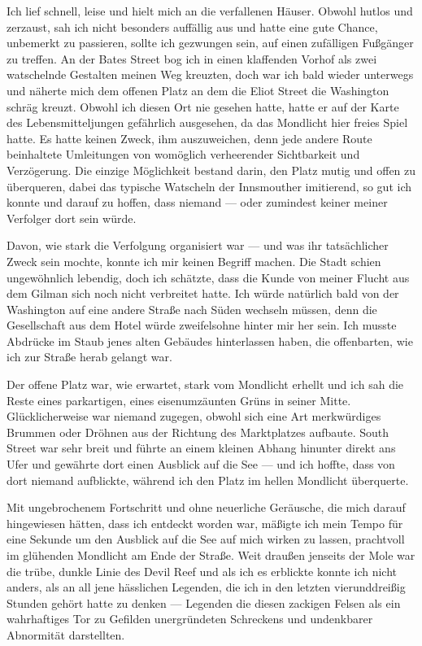 Ich lief schnell, leise und hielt mich an die verfallenen Häuser. Obwohl hutlos und zerzaust, sah ich nicht besonders auffällig aus und hatte eine gute Chance, unbemerkt zu passieren, sollte ich gezwungen sein, auf einen zufälligen Fußgänger zu treffen. An der Bates Street bog ich in einen klaffenden Vorhof als zwei watschelnde Gestalten meinen Weg kreuzten, doch war ich bald wieder unterwegs und näherte mich dem offenen Platz an dem die Eliot Street die Washington schräg kreuzt. Obwohl ich diesen Ort nie gesehen hatte, hatte er auf der Karte des Lebensmitteljungen gefährlich ausgesehen, da das Mondlicht hier freies Spiel hatte. Es hatte keinen Zweck, ihm auszuweichen, denn jede andere Route beinhaltete Umleitungen von womöglich verheerender Sichtbarkeit und Verzögerung. Die einzige Möglichkeit bestand darin, den Platz mutig und offen zu überqueren, dabei das typische Watscheln der Innsmouther imitierend, so gut ich konnte und darauf zu hoffen, dass niemand --- oder zumindest keiner meiner Verfolger dort sein würde.

Davon, wie stark die Verfolgung organisiert war --- und was ihr tatsächlicher Zweck sein mochte, konnte ich mir keinen Begriff machen. Die Stadt schien ungewöhnlich lebendig, doch ich schätzte, dass die Kunde von meiner Flucht aus dem Gilman sich noch nicht verbreitet hatte. Ich würde natürlich bald von der Washington auf eine andere Straße nach Süden wechseln müssen, denn die Gesellschaft aus dem Hotel würde zweifelsohne hinter mir her sein. Ich musste Abdrücke im Staub jenes alten Gebäudes hinterlassen haben, die offenbarten, wie ich zur Straße herab gelangt war.

Der offene Platz war, wie erwartet, stark vom Mondlicht erhellt und ich sah die Reste eines parkartigen, eines eisenumzäunten Grüns in seiner Mitte. Glücklicherweise war niemand zugegen, obwohl sich eine Art merkwürdiges Brummen oder Dröhnen aus der Richtung des Marktplatzes aufbaute. South Street war sehr breit und führte an einem kleinen Abhang hinunter direkt ans Ufer und gewährte dort einen Ausblick auf die See --- und ich hoffte, dass von dort niemand aufblickte, während ich den Platz im hellen Mondlicht überquerte.

Mit ungebrochenem Fortschritt und ohne neuerliche Geräusche, die mich darauf hingewiesen hätten, dass ich entdeckt worden war, mäßigte ich mein Tempo für eine Sekunde um den Ausblick auf die See auf mich wirken zu lassen, prachtvoll im glühenden Mondlicht am Ende der Straße. Weit draußen jenseits der Mole war die trübe, dunkle Linie des Devil Reef und als ich es erblickte konnte ich nicht anders, als an all jene hässlichen Legenden, die ich in den letzten vierunddreißig Stunden gehört hatte zu denken --- Legenden die diesen zackigen Felsen als ein wahrhaftiges Tor zu Gefilden unergründeten Schreckens und undenkbarer Abnormität darstellten.

